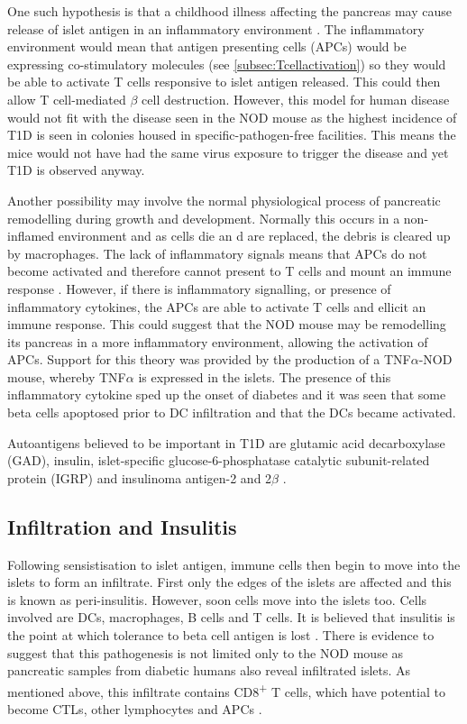 One such hypothesis is that a childhood illness affecting the pancreas may cause release of islet antigen in an inflammatory environment \citep{Green1999, Andreoletti1997}.
The inflammatory environment would mean that antigen presenting cells (APCs) would be expressing co-stimulatory molecules (see \cref{subsec:Tcellactivation}) so they would be able to activate T cells responsive to islet antigen released.
This could then allow T cell-mediated $\beta$ cell destruction.
However, this model for human disease would not fit with the disease seen in the NOD mouse as the highest incidence of T1D is seen in colonies housed in specific-pathogen-free facilities\citep{Delovitch1997}.
This means the mice would not have had the same virus exposure to trigger the disease and yet T1D is observed anyway.

Another possibility may involve the normal physiological process of pancreatic remodelling during growth and development.
Normally this occurs in a non-inflamed environment and as cells die an d are replaced, the debris is cleared up by macrophages.
The lack of inflammatory signals means that APCs do not become activated and therefore cannot present to T cells and mount an immune response \citep{Green1999}.
However, if there is inflammatory signalling, or presence of inflammatory cytokines, the APCs are able to activate T cells and ellicit an immune response.
This could suggest that the NOD mouse may be remodelling its pancreas in a more inflammatory environment, allowing the activation of APCs.
Support for this theory was provided by the production of a TNF$\alpha$-NOD mouse, whereby TNF$\alpha$ is expressed in the islets.
The presence of this inflammatory cytokine sped up the onset of diabetes and it was seen that some beta cells apoptosed prior to DC infiltration and that the DCs became activated\citep{Green1998}.

Autoantigens believed to be important in T1D are glutamic acid decarboxylase (GAD), insulin, islet-specific glucose-6-phosphatase catalytic subunit-related protein (IGRP) and insulinoma antigen-2 and 2$\beta$ \citep{Green1999, Roep2012}.


\subsection{Infiltration and Insulitis}

Following sensistisation to islet antigen, immune cells then begin to move into the islets to form an infiltrate.
First only the edges of the islets are affected and this is known as peri-insulitis\citep{Thomas2000}.
However, soon cells move into the islets too.
Cells involved are DCs, macrophages, B cells and T cells\citep{Brodie2008}.
It is believed that insulitis is the point at which tolerance to beta cell antigen is lost \citep{Thomas2000}.
There is evidence to suggest that this pathogenesis is not limited only to the NOD mouse as pancreatic samples from diabetic humans also reveal infiltrated islets.
As mentioned above, this infiltrate contains CD8\textsuperscript{+} T cells, which have potential to become CTLs, other lymphocytes and APCs \citep{Hanafusa2008}.

